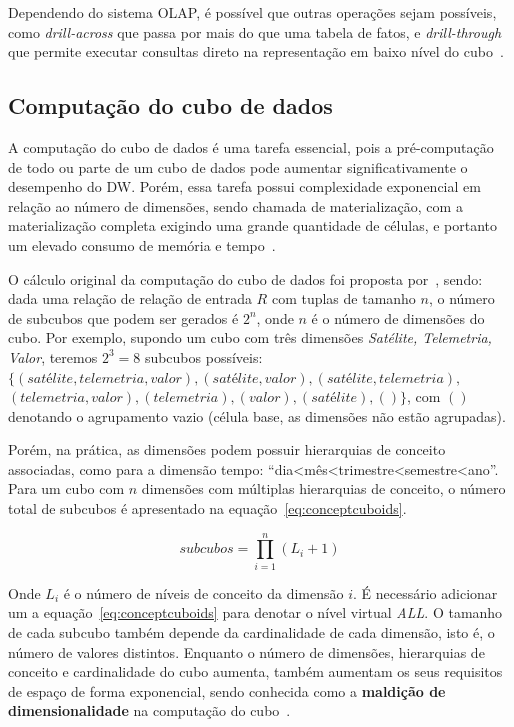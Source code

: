 Dependendo do sistema OLAP, é possível que outras operações sejam possíveis, como \textit{drill-across} que passa por mais do que uma tabela de fatos, e \textit{drill-through} que permite executar consultas direto na representação em baixo nível do cubo~\cite{hanDataMiningConcepts2011}.

\subsection{Computação do cubo de dados}\label{ch:fun:cube:comp}

A computação do cubo de dados é uma tarefa essencial, pois a pré-computação de todo ou parte de um cubo de dados pode aumentar significativamente o desempenho do DW.
Porém, essa tarefa possui complexidade exponencial em relação ao número de dimensões, sendo chamada de materialização, com a materialização completa exigindo uma grande quantidade de células, e portanto um elevado consumo de memória e tempo~\cite{hanDataMiningConcepts2011}.

O cálculo original da computação do cubo de dados foi proposta por~\cite{grayDataCubeRelational1996}, sendo: dada uma relação de relação de entrada $R$ com tuplas de tamanho $n$, o número de subcubos que podem ser gerados é $2^n$, onde $n$ é o número de dimensões do cubo.
Por exemplo, supondo um cubo com três dimensões \textit{Satélite, Telemetria, Valor}, teremos $2^3 = 8$ subcubos possíveis: $\{(satélite, telemetria, valor), (satélite, valor), (satélite, telemetria),$ $(telemetria, valor), (telemetria), (valor), (satélite), () \}$, com $()$ denotando o agrupamento vazio (célula base, as dimensões não estão agrupadas).

Porém, na prática, as dimensões podem possuir hierarquias de conceito associadas, como para a dimensão tempo: ``dia<mês<trimestre<semestre<ano''.
Para um cubo com $n$ dimensões com múltiplas hierarquias de conceito, o número total de subcubos é apresentado na equação~\ref{eq:conceptcuboids}.

\begin{equation}
	subcubos = \prod_{i=1}^n (L_i + 1)
\label{eq:conceptcuboids}
\end{equation}

Onde $L_i$ é o número de níveis de conceito da dimensão $i$.
É necessário adicionar um a equação~\ref{eq:conceptcuboids} para denotar o nível virtual \textit{ALL}.
O tamanho de cada subcubo também depende da cardinalidade de cada dimensão, isto é, o número de valores distintos.
Enquanto o número de dimensões, hierarquias de conceito e cardinalidade do cubo aumenta, também aumentam os seus requisitos de espaço de forma exponencial, sendo conhecida como a \textbf{maldição de dimensionalidade} na computação do cubo~\cite{hanDataMiningConcepts2011}.

